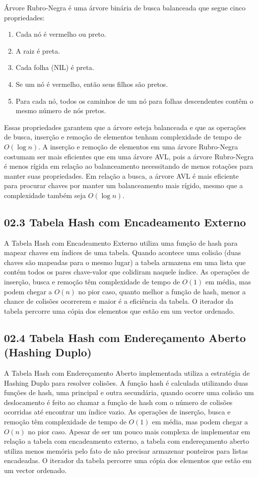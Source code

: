 \documentclass{article}
\begin{document}
Árvore Rubro-Negra é uma árvore binária de busca balanceada que segue cinco propriedades:
\begin{enumerate}
    \item Cada nó é vermelho ou preto.
    \item A raiz é preta.
    \item Cada folha (NIL) é preta.
    \item Se um nó é vermelho, então seus filhos são pretos.
    \item Para cada nó, todos os caminhos de um nó para folhas descendentes contêm o mesmo número de nós pretos.
\end{enumerate}
Essas propriedades garantem que a árvore esteja balanceada e que as operações de busca, inserção e remoção de elementos tenham complexidade de tempo de \(\displaystyle O(\log n)\).
A inserção e remoção de elementos em uma árvore Rubro-Negra costumam ser mais eficientes que em uma árvore AVL, pois a árvore Rubro-Negra é menos rígida em relação ao balanceamento necessitando de menos rotações para manter suas propriedades.
Em relação a busca, a árvore AVL é mais eficiente para procurar chaves por manter um balanceamento mais rígido, mesmo que a complexidade também seja \(\displaystyle O(\log n)\).

\subsection*{02.3 Tabela Hash com Encadeamento Externo}

A Tabela Hash com Encadeamento Externo utiliza uma função de hash para mapear chaves em índices de uma tabela. Quando acontece uma colisão
(duas chaves são mapeadas para o mesmo lugar) a tabela armazena em uma lista que contém todos os pares chave-valor que colidiram naquele índice. 
As operações de inserção, busca e remoção têm complexidade de tempo de \(\displaystyle O(1)\) em média, mas podem chegar a \(\displaystyle O(n)\) no pior caso,
quanto melhor  a função de hash, menor a chance de colisões ocorrerem e maior é a eficiência da tabela. 
O iterador da tabela percorre uma cópia dos elementos que estão em um vector ordenado.


\subsection*{02.4 Tabela Hash com Endereçamento Aberto (Hashing Duplo)}
A Tabela Hash com Endereçamento Aberto implementada utiliza a estratégia de Hashing Duplo para resolver colisões.
A função hash é calculada utilizando duas funções de hash, uma principal e outra secundária, quando ocorre uma colisão um deslocamento 
é feito ao chamar a função de hash com o número de colisões ocorridas até encontrar um índice vazio.
As operações de inserção, busca e remoção têm complexidade de tempo de \(\displaystyle O(1)\) em média, mas podem chegar a \(\displaystyle O(n)\) no pior caso. Apesar de ser um pouco mais complexa de implementar em relação a tabela com encadeamento externo, a tabela com endereçamento aberto utiliza menos memória pelo fato de não precisar armazenar ponteiros para listas encadeadas.
O iterador da tabela percorre uma cópia dos elementos que estão em um vector ordenado.
\end{document}
